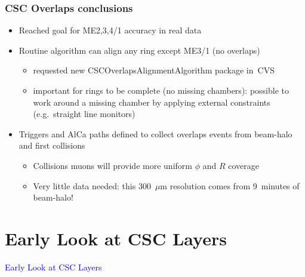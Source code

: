 \documentclass[compress]{beamer}
\begin{document}
\begin{frame}
\frametitle{CSC Overlaps conclusions}
\begin{itemize}\setlength{\itemsep}{0.35 cm}
\item Reached goal for ME2,3,4/1 accuracy in real data
\item Routine algorithm can align any ring except ME3/1 (no overlaps)
\begin{itemize}\setlength{\itemsep}{0.15 cm}
\item requested new CSCOverlapsAlignmentAlgorithm package \mbox{in CVS\hspace{-1 cm}}
\item important for rings to be complete (no missing chambers):
  possible to work around a missing chamber by applying external
  constraints (e.g.\ straight line monitors)
\end{itemize}
\item Triggers and AlCa paths defined to collect overlaps events from beam-halo and first collisions
\begin{itemize}\setlength{\itemsep}{0.15 cm}
\item Collisions muons will provide more uniform $\phi$ and $R$ coverage
\item Very little data needed: this 300~$\mu$m resolution comes from 9~minutes of beam-halo!
\end{itemize}
\end{itemize}
\end{frame}

\section*{Early Look at CSC Layers}
\begin{frame}
\begin{center}
\Huge \textcolor{blue}{Early Look at CSC Layers}
\end{center}
\end{frame}
\end{document}
